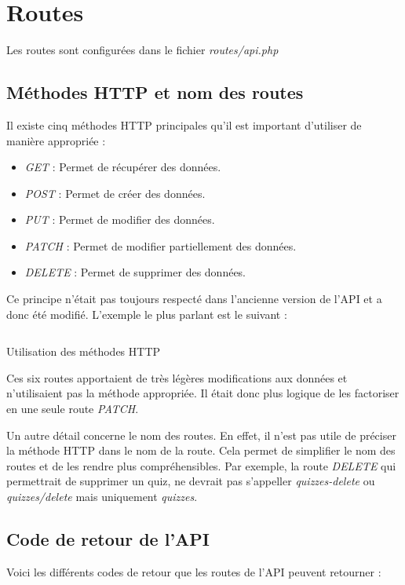 \section{Routes}
Les routes sont configurées dans le fichier \emph{routes/api.php}
\subsection{Méthodes HTTP et nom des routes}
Il existe cinq méthodes HTTP principales qu'il est important d'utiliser de manière appropriée :
\begin{itemize}
    \item \emph{GET} : Permet de récupérer des données.
    \item \emph{POST} : Permet de créer des données.
    \item \emph{PUT} : Permet de modifier des données.
    \item \emph{PATCH} : Permet de modifier partiellement des données.
    \item \emph{DELETE} : Permet de supprimer des données.
\end{itemize}

Ce principe n'était pas toujours respecté dans l'ancienne version de l'API et a donc été modifié. L'exemple le plus parlant est le suivant :

\begin{listing}[H]
    \inputminted{php}{assets/code/routesMethod.php}
    \caption{Utilisation des méthodes HTTP}
\end{listing}

Ces six routes apportaient de très légères modifications aux données et n'utilisaient pas la méthode appropriée. Il était donc plus logique de les factoriser en une seule route \emph{PATCH}.

Un autre détail concerne le nom des routes. En effet, il n'est pas utile de préciser la méthode HTTP dans le nom de la route. Cela permet de simplifier le nom des routes et de les rendre plus compréhensibles. Par exemple, la route \emph{DELETE} qui permettrait de supprimer un quiz, ne devrait pas s'appeller \emph{quizzes-delete} ou \emph{quizzes/delete} mais uniquement \emph{quizzes}.

\subsection{Code de retour de l'API}
Voici les différents codes de retour que les routes de l'API peuvent retourner :

